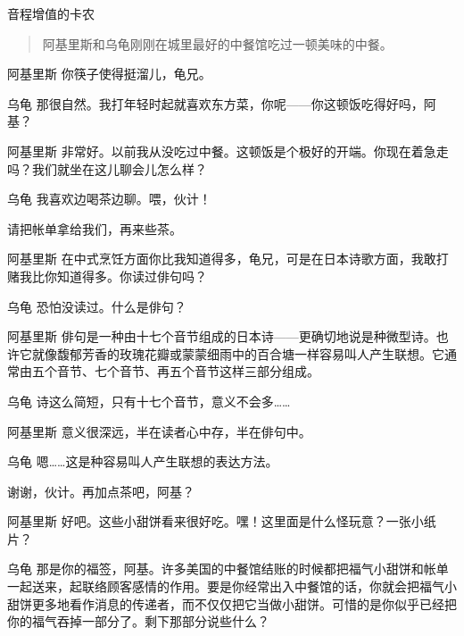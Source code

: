
\begin{dialog}{音程增值的卡农}

\begin{quote}
阿基里斯和乌龟刚刚在城里最好的中餐馆吃过一顿美味的中餐。
\end{quote}

\begin{dialogue}

\item[阿基里斯]你筷子使得挺溜儿，龟兄。

\item[乌龟]那很自然。我打年轻时起就喜欢东方菜，你呢——你这顿饭吃得好吗，阿基？

\item[阿基里斯]非常好。以前我从没吃过中餐。这顿饭是个极好的开端。你现在着急走吗？我们就坐在这儿聊会儿怎么样？

\item[乌龟]我喜欢边喝茶边聊。喂，伙计！


请把帐单拿给我们，再来些茶。


\item[阿基里斯]在中式烹饪方面你比我知道得多，龟兄，可是在日本诗歌方面，我敢打赌我比你知道得多。你读过俳句吗？

\item[乌龟]恐怕没读过。什么是俳句？

\item[阿基里斯]俳句是一种由十七个音节组成的日本诗——更确切地说是种微型诗。也许它就像馥郁芳香的玫瑰花瓣或蒙蒙细雨中的百合塘一样容易叫人产生联想。它通常由五个音节、七个音节、再五个音节这样三部分组成。

\item[乌龟]诗这么简短，只有十七个音节，意义不会多……

\item[阿基里斯]意义很深远，半在读者心中存，半在俳句中。

\item[乌龟]嗯……这是种容易叫人产生联想的表达方法。

谢谢，伙计。再加点茶吧，阿基？

\item[阿基里斯]好吧。这些小甜饼看来很好吃。嘿！这里面是什么怪玩意？一张小纸片？

\item[乌龟]那是你的福签，阿基。许多美国的中餐馆结账的时候都把福气小甜饼和帐单一起送来，起联络顾客感情的作用。要是你经常出入中餐馆的话，你就会把福气小甜饼更多地看作消息的传递者，而不仅仅把它当做小甜饼。可惜的是你似乎已经把你的福气吞掉一部分了。剩下那部分说些什么？


\end{dialogue}
\end{dialog}
